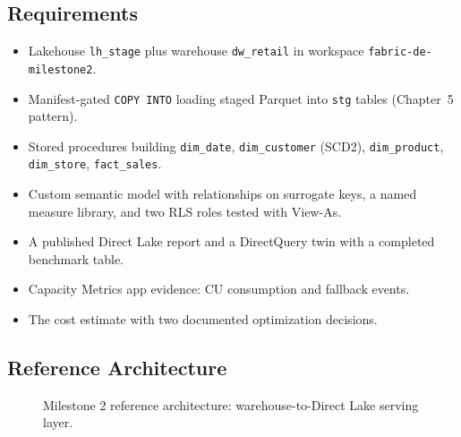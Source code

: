 \subsection*{Requirements}
\begin{itemize}
    \item Lakehouse \texttt{lh\_stage} plus warehouse \texttt{dw\_retail} in workspace \texttt{fabric-de-milestone2}.
    \item Manifest-gated \texttt{COPY INTO} loading staged Parquet into \texttt{stg} tables (Chapter~5 pattern).
    \item Stored procedures building \texttt{dim\_date}, \texttt{dim\_customer} (SCD2), \texttt{dim\_product}, \texttt{dim\_store}, \texttt{fact\_sales}.
    \item Custom semantic model with relationships on surrogate keys, a named measure library, and two RLS roles tested with View-As.
    \item A published Direct Lake report and a DirectQuery twin with a completed benchmark table.
    \item Capacity Metrics app evidence: CU consumption and fallback events.
    \item The cost estimate with two documented optimization decisions.
\end{itemize}

\subsection*{Reference Architecture}
\begin{figure}[H]
    \centering
    \caption{Milestone 2 reference architecture: warehouse-to-Direct Lake serving layer.}
    \label{fig:chapter8-capstone-architecture}
\end{figure}

